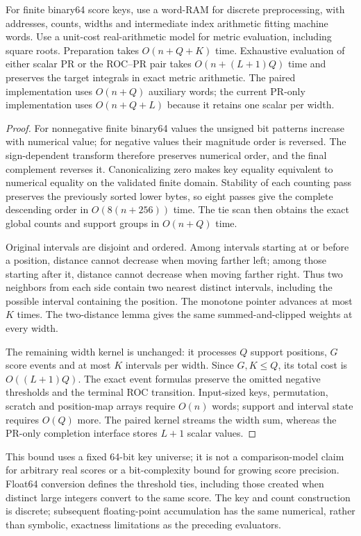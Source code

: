 \begin{proposition}
\label{prop:radix}
For finite binary64 score keys, use a word-RAM for discrete preprocessing,
with addresses, counts, widths and intermediate index arithmetic fitting
machine words. Use a unit-cost real-arithmetic model for metric evaluation,
including square roots. Preparation takes $O(n+Q+K)$ time. Exhaustive evaluation of
either scalar PR or the ROC--PR pair takes $O(n+(L+1)Q)$ time and preserves
the target integrals in exact metric arithmetic. The paired implementation
uses $O(n+Q)$ auxiliary words; the current PR-only implementation uses
$O(n+Q+L)$ because it retains one scalar per width.
\end{proposition}
\begin{proof}
For nonnegative finite binary64 values the unsigned bit patterns increase
with numerical value; for negative values their magnitude order is reversed.
The sign-dependent transform therefore preserves numerical order, and the
final complement reverses it. Canonicalizing zero makes key equality
equivalent to numerical equality on the validated finite domain. Stability
of each counting pass preserves the previously sorted lower bytes, so eight
passes give the complete descending order in $O(8(n+256))$ time. The tie scan
then obtains the exact global counts and support groups in $O(n+Q)$ time.

Original intervals are disjoint and ordered. Among intervals starting at or
before a position, distance cannot decrease when moving farther left; among
those starting after it, distance cannot decrease when moving farther right.
Thus two neighbors from each side contain two nearest distinct intervals,
including the possible interval containing the position. The monotone
pointer advances at most $K$ times. The two-distance lemma gives the same
summed-and-clipped weights at every width.

The remaining width kernel is unchanged: it processes $Q$ support positions,
$G$ score events and at most $K$ intervals per width. Since $G,K\le Q$, its
total cost is $O((L+1)Q)$. The exact event formulas preserve the omitted
negative thresholds and the terminal ROC transition. Input-sized keys,
permutation, scratch and position-map arrays require $O(n)$ words; support
and interval state requires $O(Q)$ more. The paired kernel streams the width
sum, whereas the PR-only completion interface stores $L+1$ scalar values.
\end{proof}

This bound uses a fixed 64-bit key universe; it is not a comparison-model
claim for arbitrary real scores or a bit-complexity bound for growing score
precision. Float64 conversion defines the threshold ties, including those
created when distinct large integers convert to the same score. The key and
count construction is discrete; subsequent floating-point accumulation has
the same numerical, rather than symbolic, exactness limitations as the
preceding evaluators.
